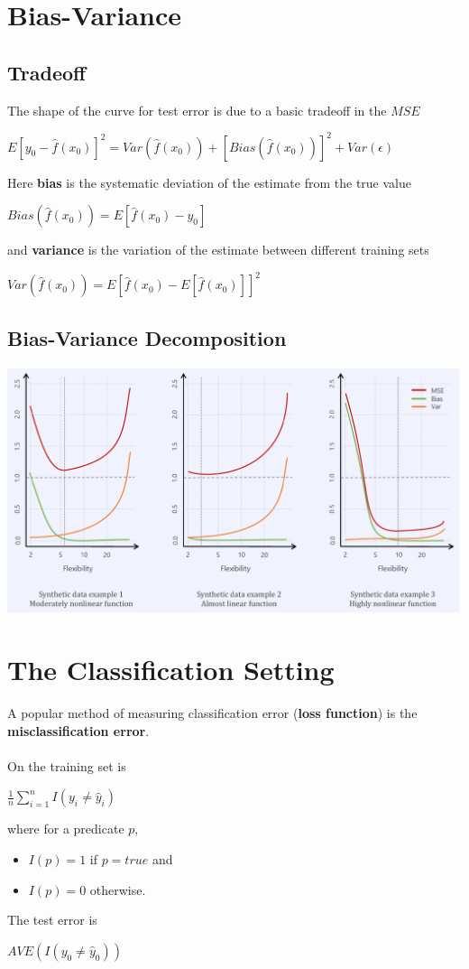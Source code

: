 	\section{Bias-Variance}
		\subsection{Tradeoff}
			The shape of the curve for test error is due to a basic tradeoff in the $MSE$
			\begin{center}
				$E[y_0-\hat{f}(x_0)]^2 = Var(\hat{f}(x_0)) + [Bias(\hat{f}(x_0))]^2 + Var(\epsilon)$
			\end{center}
			Here \textbf{bias} is the systematic deviation of the estimate from the true value
			\begin{center}
				$Bias(\hat{f}(x_0)) = E[\hat{f}(x_0)-y_0]$
			\end{center}
			and \textbf{variance} is the variation of the estimate between different training sets
			\begin{center}
				$Var(\hat{f}(x_0)) = E[\hat{f}(x_0)-E[\hat{f}(x_0)]]^2$
			\end{center}

		\subsection{Bias-Variance Decomposition}
			\includegraphics[width=1.05\linewidth]{Graphics/Introduction/10.png}
	
	\section{The Classification Setting}
		A popular method of measuring classification error (\textbf{loss function}) is the \textbf{misclassification error}.\\\\
		On the training set is
		\begin{center}
			$\frac{1}{n} \sum\limits_{i=1}^n I(y_i \neq \hat{y}_i)$
		\end{center}
		where for a predicate $p$,
		\begin{itemize}
			\item $I(p)=1$ if $p=true$ and
			\item $I(p)=0$ otherwise.
		\end{itemize}
		The test error is
		\begin{center}
			$AVE(I(y_0 \neq \hat{y}_0))$
		\end{center}
		
